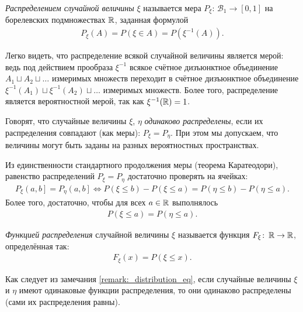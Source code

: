 \documentclass[../main.tex]{subfiles}
\begin{document}
\begin{df}
 \textit{Распределением случайной величины} $\xi$ называется мера $ P_{\xi} \colon\, \mathcal B_1 \to [0, 1] $ на борелевских подмножествах $\mathbb{R}$, заданная формулой
 \begin{align*}
  P_{\xi}(A) = P(\xi \in A) = P(\xi^{-1}(A)).
 \end{align*} 
\end{df}
\begin{remrk*}
 Легко видеть, что распределение всякой случайной величины является мерой: ведь под действием прообраза $ \xi^{-1} $ всякое счётное дизъюнктное объединение $ A_1 \sqcup A_2 \sqcup \ldots $ измеримых множеств переходит в счётное дизъюнктное объединение $ \xi^{-1}(A_1) \sqcup \xi^{-1}(A_2) \sqcup \ldots $ измеримых множеств. Более того, распределение является вероятностной мерой, так как $ \xi^{-1}(\mathbb{R}) = 1 $.
\end{remrk*}
\begin{df*}
 Говорят, что случайные величины $\xi$, $\eta$ \textit{одинаково распределены}, если их распределения совпадают (как меры): $P_{\xi} = P_{\eta}$. При этом мы допускаем, что величины могут быть заданы на разных вероятностных пространствах.
\end{df*}
\begin{remrk}
 \label{remark:_distribution_eq}
 Из единственности стандартного продолжения меры (теорема Каратеодори), равенство распределений $P_{\xi} = P_{\eta}$  достаточно проверять на ячейках:
 \begin{align*}
  P_{\xi} \left(a, b\right] = P_{\eta} \left(a, b\right]  \iff P(\xi \leqslant b) - P(\xi \leqslant a) =  P(\eta \leqslant b) - P(\eta \leqslant a)
 .\end{align*} Более того, достаточно, чтобы для всех $a \in \mathbb{R}$ выполнялось
 \begin{align*}
  P(\xi \leqslant a) = P(\eta \leqslant a).
 \end{align*} 
\end{remrk}
\begin{df}
 \textit{Функцией распределения} случайной величины $\xi$ называется функция $F_{\xi} \colon\, \mathbb{R} \to \mathbb{R}$, определённая так:
 \begin{align*}
  F_{\xi}(x) = P(\xi \leqslant x).
 \end{align*} 
\end{df}
\begin{remrk*}
 Как следует из замечания \ref{remark:_distribution_eq}, если случайные величины $ \xi $ и $ \eta $ имеют одинаковые функции распределения, то они одинаково распределены (сами их распределения равны).
\end{remrk*}
\end{document}
